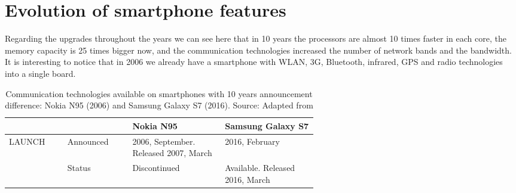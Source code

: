 \chapter{Evolution of smartphone features}
\label{ape:gsmarena-n95-s7}

Regarding the upgrades throughout the years we can see here that in 10 years the processors are almost 10 times faster in each core, the memory capacity is 25 times bigger now, and  the communication technologies increased the number of network bands and the bandwidth.
It is interesting to notice that in 2006 we already have a smartphone with WLAN, 3G, Bluetooth, infrared, GPS and radio technologies into a single board.

\begin{longtable}{llp{0.3\linewidth}p{0.3\linewidth}}
\caption{Communication technologies available on smartphones with 10 years announcement difference: Nokia N95 (2006) and Samsung Galaxy S7 (2016). Source: Adapted from \cite{GSMARENA2016-n95-s7}} \\ \hline
         &               & Nokia N95                                                   & Samsung Galaxy S7                                                                                                                                                                                                  \\ \hline \endhead
         
LAUNCH   & Announced     & 2006, September. Released 2007, March                        & 2016, February                                                                                                                                                                                              \\
         & Status        & Discontinued                                                 & Available. Released 2016, March                                                                                                                                                                             \\ \hline
         

\end{longtable}

